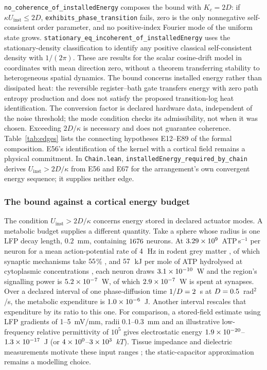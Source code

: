 \documentclass{article}
\renewcommand{\cite}[1]{\citep{#1}}
\begin{document}
\nolinkurl{no_coherence_of_installedEnergy}
composes the bound with $K_c=2D$: if $\kappa U_{\mathrm{inst}}\leq2D$,
\nolinkurl{exhibits_phase_transition} fails, zero is
the only nonnegative self-consistent order parameter, and no positive-index
Fourier mode of the uniform state grows.
\nolinkurl{stationary_eq_incoherent_of_installedEnergy}
uses the stationary-density classification to identify any positive classical
self-consistent density with $1/(2\pi)$. These are results for the scalar
cosine-drift model in coordinates with mean direction zero, without a theorem
transferring stability to heterogeneous spatial dynamics. The bound concerns
installed energy rather than dissipated heat: the reversible register--bath
gate transfers energy with zero path entropy production and does not satisfy
the proposed transition-log heat identification. The conversion factor is
declared hardware data, independent of the noise threshold; the mode condition
checks its admissibility, not when it was chosen. Exceeding $2D/\kappa$ is
necessary and does not guarantee coherence. Table~\ref{tab:edges} lists the connecting hypotheses E12--E89 of the formal composition. E56's identification of the kernel
with a cortical field remains a physical commitment. In \texttt{Chain.lean},
\nolinkurl{installedEnergy_required_by_chain}
derives $U_{\mathrm{inst}}>2D/\kappa$ from E56 and E67 for the arrangement's
own convergent energy sequence; it supplies neither edge.

\subsubsection*{The bound against a cortical energy budget}
\label{sec:supp-energy-budget}

The condition $U_{\mathrm{inst}}>2D/\kappa$ concerns energy stored in declared actuator modes. A metabolic budget supplies a different quantity. Take a sphere whose radius is one LFP decay length, $0.2$~mm, containing $1676$ neurons. At $3.29\times10^{9}$~ATP\,s$^{-1}$ per neuron for a mean action-potential rate of $4$~Hz in rodent grey matter \cite{attwell2001}, of which synaptic mechanisms take $55$\% \cite{harris2012}, and $57$~kJ per mole of ATP hydrolysed at cytoplasmic concentrations \cite{nicholls2013}, each neuron draws $3.1\times10^{-10}$~W and the region's signalling power is $5.2\times10^{-7}$~W, of which $2.9\times10^{-7}$~W is spent at synapses. Over a declared interval of one phase-diffusion time $1/D=2$~s at $D=0.5$~rad$^2$/s, the metabolic expenditure is $1.0\times10^{-6}$~J. Another interval rescales that expenditure by its ratio to this one. For comparison, a stored-field estimate using LFP gradients of 1--5~mV/mm, radii 0.1--0.3~mm and an illustrative low-frequency relative permittivity of $10^5$ gives electrostatic energy $1.9\times10^{-20}$--$1.3\times10^{-17}$~J (or $4\times10^{0}$--$3\times10^{3}$~$kT$). Tissue impedance and dielectric measurements motivate these input ranges \cite{barbour2017,logothetis2007,gabriel1996}; the static-capacitor approximation remains a modelling choice.
\end{document}
